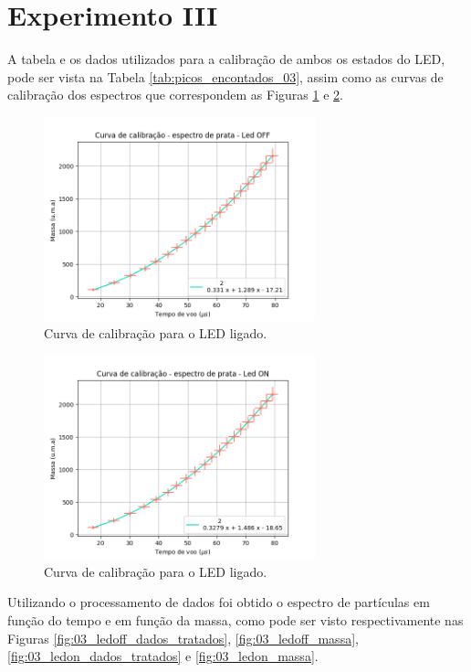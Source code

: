 \section{Experimento III}
A tabela e os dados utilizados para a calibração de ambos os estados do LED, pode ser vista na Tabela \ref{tab:picos_encontados_03}, assim como as curvas de calibração dos espectros que correspondem as Figuras \ref{fig:03_calib_ledOFF} e \ref{fig:03_calib_ledON}.

\begin{figure}
  \centering  
  \includegraphics[width=0.7\textwidth]{exp_03/LEDOFF_curv+erro_calib.png}
  \caption{Curva de calibração para o LED ligado.}
  \label{fig:03_calib_ledOFF} 
\end{figure}

\begin{figure}
  \centering  
  \includegraphics[width=0.7\textwidth]{exp_03/LEDON_curv+erro_calib.png}
  \caption{Curva de calibração para o LED ligado.}
  \label{fig:03_calib_ledON} 
\end{figure}



Utilizando o processamento de dados foi obtido o espectro de partículas em função do tempo e em função da massa, como pode ser visto respectivamente nas Figuras \ref{fig:03_ledoff_dados_tratados}, \ref{fig:03_ledoff_massa}, \ref{fig:03_ledon_dados_tratados} e \ref{fig:03_ledon_massa}.

